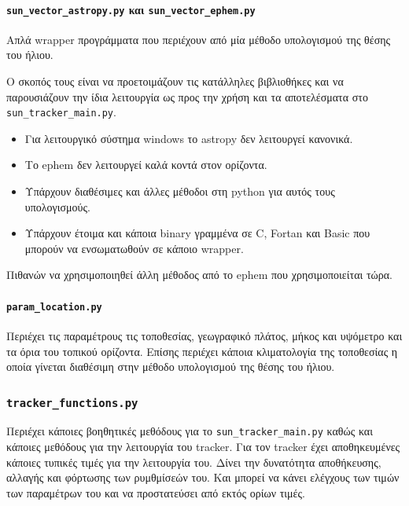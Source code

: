 \documentclass[
  a4paper,
  twoside,
  titlepage,
  11pt]{article}
\providecommand{\tightlist}{%
  \setlength{\itemsep}{0pt}\setlength{\parskip}{0pt}}
\numberwithin{equation}{section}
\numberwithin{figure}{section}
\numberwithin{table}{section}
\begin{document}
\hypertarget{sun_vector_astropy.py-ux3baux3b1ux3b9-sun_vector_ephem.py}{%
\paragraph{\texorpdfstring{\texttt{sun\_vector\_astropy.py} και \texttt{sun\_vector\_ephem.py}}{sun\_vector\_astropy.py και sun\_vector\_ephem.py}}\label{sun_vector_astropy.py-ux3baux3b1ux3b9-sun_vector_ephem.py}}

Απλά wrapper προγράμματα που περιέχουν από μία μέθοδο υπολογισμού της θέσης του ήλιου.

Ο σκοπός τους είναι να προετοιμάζουν τις κατάλληλες βιβλιοθήκες και να παρουσιάζουν την ίδια λειτουργία ως προς την χρήση και τα αποτελέσματα στο \texttt{sun\_tracker\_main.py}.

\begin{itemize}
\tightlist
\item
  Για λειτουργικό σύστημα windows το astropy δεν λειτουργεί κανονικά.
\item
  Το ephem δεν λειτουργεί καλά κοντά στον ορίζοντα.
\item
  Υπάρχουν διαθέσιμες και άλλες μέθοδοι στη python για αυτός τους υπολογισμούς.
\item
  Υπάρχουν έτοιμα και κάποια binary γραμμένα σε C, Fortan και Basic που μπορούν να ενσωματωθούν σε κάποιο wrapper.
\end{itemize}

Πιθανών να χρησιμοποιηθεί άλλη μέθοδος από το ephem που χρησιμοποιείται τώρα.

\hypertarget{param_location.py}{%
\paragraph{\texorpdfstring{\texttt{param\_location.py}}{param\_location.py}}\label{param_location.py}}

Περιέχει τις παραμέτρους τις τοποθεσίας, γεωγραφικό πλάτος, μήκος και υψόμετρο και τα όρια του τοπικού ορίζοντα. Επίσης περιέχει κάποια κλιματολογία της τοποθεσίας η οποία γίνεται διαθέσιμη στην μέθοδο υπολογισμού της θέσης του ήλιου.

\hypertarget{tracker_functions.py}{%
\subsubsection{\texorpdfstring{\texttt{tracker\_functions.py}}{tracker\_functions.py}}\label{tracker_functions.py}}

Περιέχει κάποιες βοηθητικές μεθόδους για το \texttt{sun\_tracker\_main.py} καθώς και κάποιες μεθόδους για την λειτουργία του tracker. Για τον tracker έχει αποθηκευμένες κάποιες τυπικές τιμές για την λειτουργία του. Δίνει την δυνατότητα αποθήκευσης, αλλαγής και φόρτωσης των ρυμθμίσεών του. Και μπορεί να κάνει ελέγχους των τιμών των παραμέτρων του και να προστατεύσει από εκτός ορίων τιμές.
\end{document}
